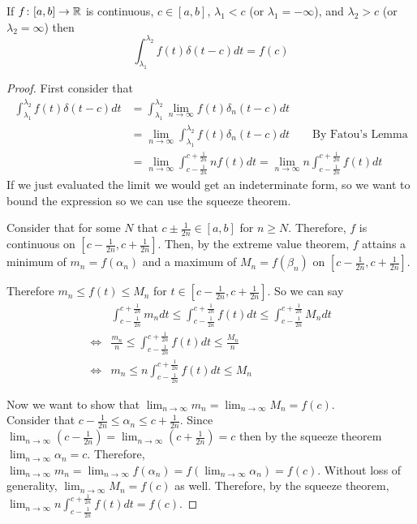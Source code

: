 \documentclass[notes]{subfiles}
\begin{document}
\begin{theorem}
    If $f\colon [a, b] \to \mathbb{R}$ is continuous, $c \in [a, b]$, $\lambda_1 < c$ (or $\lambda_1 = -\infty$), and $\lambda_2 > c$ (or $\lambda_2 = \infty$) then
    \[
        \int_{\lambda_1}^{\lambda_2} f(t)\delta(t - c)dt = f(c)
    \]
\end{theorem}
\begin{proof}
    First consider that
    \begin{align*}
        \int_{\lambda_1}^{\lambda_2} f(t)\delta(t - c)dt
        &= \int_{\lambda_1}^{\lambda_2} \lim_{n\to\infty} f(t) \delta_n(t - c) dt \\
        &= \lim_{n\to\infty} \int_{\lambda_1}^{\lambda_2} f(t) \delta_n(t - c) dt \qquad \text{By Fatou's Lemma} \\
        &= \lim_{n\to\infty} \int_{c - \frac{1}{2n}}^{c + \frac{1}{2n}} nf(t)dt
        = \lim_{n\to\infty} n \int_{c - \frac{1}{2n}}^{c + \frac{1}{2n}} f(t)dt
    \end{align*}
    If we just evaluated the limit we would get an indeterminate form, so we want to bound the expression so we can use the squeeze theorem.

    Consider that for some $N$ that $c \pm \frac{1}{2n} \in [a, b]$ for $n \geq N$. Therefore, $f$ is continuous on $\left[c - \frac{1}{2n}, c + \frac{1}{2n}\right]$. Then, by the extreme value theorem, $f$ attains a minimum of $m_n = f(\alpha_n)$ and a maximum of $M_n = f(\beta_n)$ on $\left[c - \frac{1}{2n}, c + \frac{1}{2n}\right]$.

    Therefore $m_n \leq f(t) \leq M_n$ for $t \in \left[c - \frac{1}{2n}, c + \frac{1}{2n}\right]$. So we can say
    \begin{align*}
        &\int_{c - \frac{1}{2n}}^{c + \frac{1}{2n}} m_n dt \leq \int_{c - \frac{1}{2n}}^{c + \frac{1}{2n}} f(t)dt \leq \int_{c - \frac{1}{2n}}^{c + \frac{1}{2n}} M_n dt \\
        \iff& \frac{m_n}{n} \leq \int_{c - \frac{1}{2n}}^{c + \frac{1}{2n}} f(t)dt \leq \frac{M_n}{n} \\
        \iff& m_n \leq n\int_{c - \frac{1}{2n}}^{c + \frac{1}{2n}} f(t)dt \leq M_n
    \end{align*}

    Now we want to show that $\lim_{n\to\infty} m_n = \lim_{n\to\infty} M_n = f(c)$. \\ Consider that $c - \frac{1}{2n} \leq \alpha_n \leq c + \frac{1}{2n}$. Since $\lim_{n\to\infty} \left(c - \frac{1}{2n}\right) = \lim_{n\to\infty} \left(c + \frac{1}{2n}\right) = c$ then by the squeeze theorem $\lim_{n\to\infty} \alpha_n = c$. Therefore, $\lim_{n\to\infty} m_n = \lim_{n\to\infty} f(\alpha_n) = f\left(\lim_{n\to\infty} \alpha_n\right) = f(c)$. Without loss of generality, $\lim_{n\to\infty} M_n = f(c)$ as well. Therefore, by the squeeze theorem, $\lim_{n\to\infty} n\int_{c - \frac{1}{2n}}^{c + \frac{1}{2n}} f(t)dt = f(c)$.
\end{proof}
\end{document}
